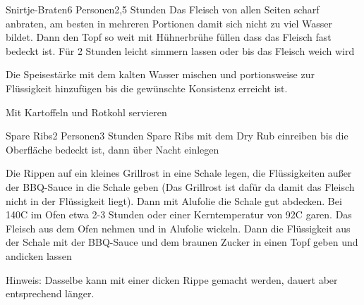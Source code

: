 
\begin{recipe}{Snirtje-Braten}{6 Personen}{2,5 Stunden}
Das Fleisch von allen Seiten scharf  anbraten, am besten in mehreren Portionen damit sich nicht zu viel Wasser bildet. Dann den Topf so weit mit Hühnerbrühe füllen dass das Fleisch fast bedeckt ist. Für 2 Stunden leicht simmern lassen oder bis das Fleisch weich wird

Die Speisestärke mit dem kalten Wasser mischen und portionsweise zur Flüssigkeit hinzufügen bis die gewünschte Konsistenz erreicht ist.

Mit Kartoffeln und Rotkohl servieren
\end{recipe}


\begin{recipe}{Spare Ribs}{2 Personen}{3 Stunden}
Spare Ribs mit dem Dry Rub einreiben bis die Oberfläche bedeckt ist, dann über Nacht einlegen

Die Rippen auf ein kleines Grillrost in eine Schale legen, die Flüssigkeiten außer der BBQ-Sauce in die Schale geben (Das Grillrost ist dafür da damit das Fleisch nicht in der Flüssigkeit liegt). Dann mit Alufolie die Schale gut abdecken.
Bei 140\0C im Ofen etwa 2-3 Stunden oder einer Kerntemperatur von 92\0C garen. 
Das Fleisch aus dem Ofen nehmen und in Alufolie wickeln. Dann die Flüssigkeit aus der Schale mit der BBQ-Sauce und dem braunen Zucker in einen Topf geben und andicken lassen

Hinweis: Dasselbe kann mit einer dicken Rippe gemacht werden, dauert aber entsprechend länger.
\end{recipe}


